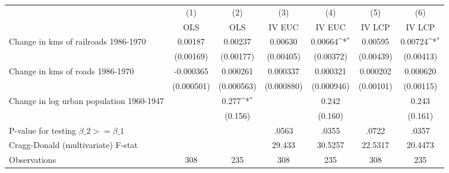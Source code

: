 {
\def\sym#1{\ifmmode^{#1}\else\(^{#1}\)\fi}
\begin{tabular}{l*{6}{c}}
\hline\hline
                &\multicolumn{1}{c}{(1)}&\multicolumn{1}{c}{(2)}&\multicolumn{1}{c}{(3)}&\multicolumn{1}{c}{(4)}&\multicolumn{1}{c}{(5)}&\multicolumn{1}{c}{(6)}\\
                &\multicolumn{1}{c}{OLS}&\multicolumn{1}{c}{OLS}&\multicolumn{1}{c}{IV EUC}&\multicolumn{1}{c}{IV EUC}&\multicolumn{1}{c}{IV LCP}&\multicolumn{1}{c}{IV LCP}\\
\hline
Change in kms of railroads 1986-1970&  0.00187         &  0.00237         &  0.00630         &  0.00664\sym{*}  &  0.00595         &  0.00724\sym{*}  \\
                &(0.00169)         &(0.00177)         &(0.00405)         &(0.00372)         &(0.00439)         &(0.00413)         \\
[1em]
Change in kms of roads 1986-1970&-0.000365         & 0.000261         & 0.000337         & 0.000321         & 0.000202         & 0.000620         \\
                &(0.000501)         &(0.000563)         &(0.000880)         &(0.000946)         &(0.00101)         &(0.00115)         \\
[1em]
Change in log urban population 1960-1947&                  &    0.277\sym{*}  &                  &    0.242         &                  &    0.243         \\
                &                  &  (0.156)         &                  &  (0.160)         &                  &  (0.161)         \\
\hline
P-value for testing $\beta\_{2} >= \beta\_{1}$&                  &                  &    .0563         &    .0355         &    .0722         &    .0357         \\
Cragg-Donald (multivariate) F-stat&                  &                  &   29.433         &  30.5257         &  22.5317         &  20.4473         \\
Observations    &      308         &      235         &      308         &      235         &      308         &      235         \\
\hline\hline
\end{tabular}
}

